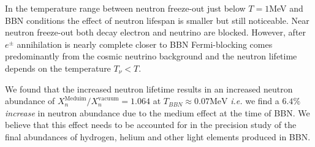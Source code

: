 In the temperature range between neutron freeze-out just below $T=1$\;MeV and BBN conditions the effect of neutron lifespan is smaller but still noticeable. Near neutron freeze-out both decay electron and neutrino are blocked. However, after $e^\pm$ annihilation is nearly complete closer to BBN Fermi-blocking comes predominantly from the cosmic neutrino background and the neutron lifetime depends on the temperature $T_\nu<T$.

We found that the increased neutron lifetime results in an increased neutron abundance of ${X_n^{\mathrm{Meduim}}}/{X_n^{\mathrm{vacuum}}}=1.064$ at $T_{BBN}\approx0.07 \mathrm{MeV}$ {\it i.e.\/} we find a $6.4\%$ \emph{increase} in neutron abundance due to the medium effect at the time of BBN. We believe that this effect needs to be accounted for in the precision study of the final abundances of hydrogen, helium and other light elements produced in BBN.